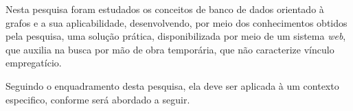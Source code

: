 \par Nesta pesquisa foram estudados os conceitos de banco de dados orientado à grafos e a sua aplicabilidade, desenvolvendo, por meio dos conhecimentos obtidos pela pesquisa, uma solução prática, disponibilizada por meio de um sistema \textit{web}, que auxilia na busca por mão de obra temporária, que não caracterize vínculo empregatício.

\par Seguindo o enquadramento desta pesquisa, ela deve ser aplicada à um contexto especifico, conforme será abordado a seguir. 




